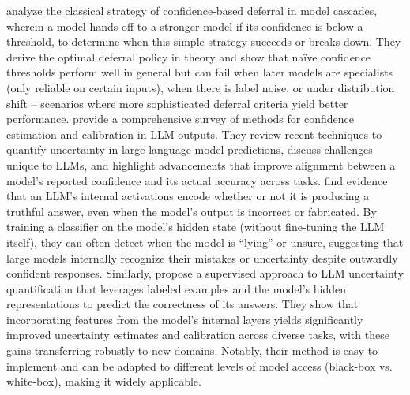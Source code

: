 \citet{NEURIPS2023_1f09e1ee} analyze the classical strategy of confidence-based deferral in model cascades, wherein a model hands off to a stronger model if its confidence is below a threshold, to determine when this simple strategy succeeds or breaks down. They derive the optimal deferral policy in theory and show that naïve confidence thresholds perform well in general but can fail when later models are specialists (only reliable on certain inputs), when there is label noise, or under distribution shift – scenarios where more sophisticated deferral criteria yield better performance. \citet{geng2023survey} provide a comprehensive survey of methods for confidence estimation and calibration in LLM outputs. They review recent techniques to quantify uncertainty in large language model predictions, discuss challenges unique to LLMs, and highlight advancements that improve alignment between a model’s reported confidence and its actual accuracy across tasks. \citet{azaria2023internal} find evidence that an LLM’s internal activations encode whether or not it is producing a truthful answer, even when the model’s output is incorrect or fabricated. By training a classifier on the model’s hidden state (without fine-tuning the LLM itself), they can often detect when the model is “lying” or unsure, suggesting that large models internally recognize their mistakes or uncertainty despite outwardly confident responses. Similarly, \citet{liu2024uncertainty} propose a supervised approach to LLM uncertainty quantification that leverages labeled examples and the model’s hidden representations to predict the correctness of its answers. They show that incorporating features from the model’s internal layers yields significantly improved uncertainty estimates and calibration across diverse tasks, with these gains transferring robustly to new domains. Notably, their method is easy to implement and can be adapted to different levels of model access (black-box vs. white-box), making it widely applicable.

